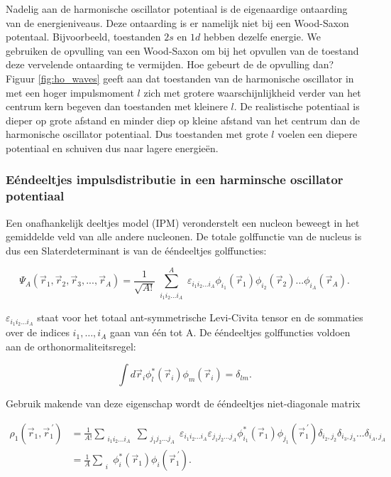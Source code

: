 \documentclass[12pt]{article}
\begin{document}
Nadelig aan de harmonische oscillator potentiaal is de eigenaardige ontaarding van de energieniveaus. Deze ontaarding is er namelijk niet bij een Wood-Saxon potentaal. Bijvoorbeeld, toestanden $2s$ en $1d$  hebben dezelfe energie. We gebruiken de opvulling van een Wood-Saxon om bij het opvullen van de toestand deze vervelende ontaarding te vermijden. Hoe gebeurt de de opvulling dan?  Figuur \ref{fig:ho_waves} geeft aan dat toestanden van de harmonische oscillator in met een hoger impulsmoment $l$ zich met grotere  waarschijnlijkheid verder van het centrum kern begeven dan toestanden met kleinere $l$. De realistische potentiaal is dieper op grote afstand en minder diep op kleine afstand van het centrum dan de harmonische oscillator potentiaal. Dus toestanden met grote $l$ voelen een diepere potentiaal en schuiven dus naar lagere energie\"{e}n. 



\subsubsection{E\'{e}ndeeltjes impulsdistributie in een harminsche oscillator potentiaal}
Een onafhankelijk deeltjes model (IPM) veronderstelt een nucleon beweegt in het gemiddelde veld van alle andere nucleonen. De totale golffunctie van de nucleus is dus een Slaterdeterminant is van de \'{e}\'{e}ndeeltjes golffuncties:

\begin{equation} \label{eq:slater}
\Psi_A(\vec{r}_1,\vec{r}_2,\vec{r}_3, ... ,\vec{r}_A)= \frac{1}{\sqrt{A!}} \sum^A_{\substack{i_1 i_2 \ldots i_A}} 
													  \varepsilon_{i_1 i_2 \ldots i_A} \phi_{i_1}(\vec{r}_1)
													         \phi_{i_2}(\vec{r}_2)...
													         \phi_{i_A}(\vec{r}_A).
\end{equation}

$\varepsilon_{i_1 i_2 \ldots i_A}$ staat voor het totaal ant-symmetrische Levi-Civita tensor en de sommaties over de indices $i_1,\ldots ,i_A$  gaan van \'{e}\'{e}n tot A. De \'{e}\'{e}ndeeltjes golffuncties voldoen aan de orthonormaliteitsregel:

\begin{equation} \label{eq:orthogonality}
\int d\vec{r}_i \phi^*_l(\vec{r}_i)\phi_m(\vec{r}_i) = \delta_{lm}.
\end{equation}

Gebruik makende van deze eigenschap wordt de \'{e}\'{e}ndeeltjes niet-diagonale matrix 

\begin{align}
\rho_1(\vec{r}_1,\vec{r}^{\ \prime}_1) 
&  = \frac{1}{A!} 	 \sum_{\substack{i_1 i_2 \ldots i_A}} \sum_{\substack{j_1j_2 \ldots j_A}} \varepsilon_{i_1 i_2 \ldots i_A} \varepsilon_{j_1j_2 \ldots j_A} \phi^*_{i_1}(\vec{r}_1) \phi_{j_1}(\vec{r}_1^{\ \prime}) 
\delta_{i_2,j_2}\delta_{i_3,j_3}...\delta_{i_A,j_A}  \nonumber \\
& = \frac{1}{A}\sum_{\substack{i}} \phi^*_i(\vec{r}_1) \phi_i(\vec{r}_1^{\ \prime}).
\end{align}
\end{document}
